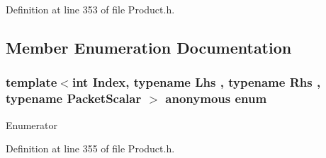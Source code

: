Definition at line 353 of file Product.\-h.



\subsection{Member Enumeration Documentation}
\hypertarget{structei__product__coeff__vectorized__unroller_ad08b7b48e05f11cfcc9f524238fe031e}{\subsubsection[{anonymous enum}]{\setlength{\rightskip}{0pt plus 5cm}template$<$int Index, typename Lhs , typename Rhs , typename Packet\-Scalar $>$ anonymous enum}}\label{structei__product__coeff__vectorized__unroller_ad08b7b48e05f11cfcc9f524238fe031e}
\begin{Desc}
\item[Enumerator]\par
\begin{description}
\item[{\em 
\hypertarget{structei__product__coeff__vectorized__unroller_ad08b7b48e05f11cfcc9f524238fe031ea55b6b191ea763f8a8d6551ff863e5dae}{Packet\-Size}\label{structei__product__coeff__vectorized__unroller_ad08b7b48e05f11cfcc9f524238fe031ea55b6b191ea763f8a8d6551ff863e5dae}
}]\end{description}
\end{Desc}


Definition at line 355 of file Product.\-h.



